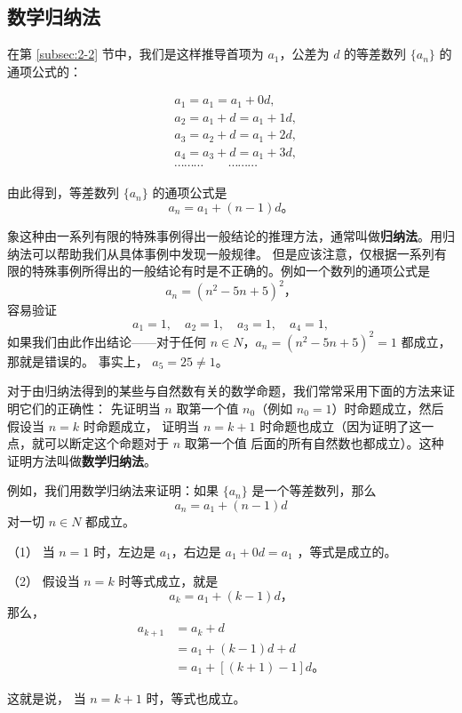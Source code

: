 \subsection{数学归纳法}\label{subsec:2-4}

在第 \ref{subsec:2-2} 节中，我们是这样推导首项为 $a_1$，公差为 $d$ 的等差数列 $\{a_n\}$ 的通项公式的：

\begin{align*}
    &a_1 = a_1 = a_1 + 0d, \\
    &a_2 = a_1 + d = a_1 + 1d, \\
    &a_3 = a_2 + d = a_1 + 2d, \\
    &a_4 = a_3 + d = a_1 + 3d, \\
    &\cdots\cdots\cdots \qquad \cdots\cdots\cdots
\end{align*}

由此得到，等差数列 $\{a_n\}$ 的通项公式是
$$ a_n = a_1 + (n - 1)d \text{。} $$

象这种由一系列有限的特殊事例得出一般结论的推理方法，通常叫做\textbf{归纳法}。用归纳法可以帮助我们从具体事例中发现一般规律。
但是应该注意，仅根据一系列有限的特殊事例所得出的一般结论有时是不正确的。例如一个数列的通项公式是
$$ a_n = (n^2 - 5n + 5)^2 \text{，} $$
容易验证
$$ a_1 = 1,\quad a_2 = 1,\quad a_3 = 1,\quad a_4 = 1, $$
如果我们由此作出结论——对于任何 $n \in N$，$a_n = (n^2 - 5n + 5)^2 = 1$ 都成立，那就是错误的。
事实上， $a_5 = 25 \neq 1$。

对于由归纳法得到的某些与自然数有关的数学命题，我们常常采用下面的方法来证明它们的正确性：
先证明当 $n$ 取第一个值 $n_0$（例如 $n_0 = 1$）时命题成立，然后假设当 $n = k$ 时命题成立，
证明当 $n = k + 1$ 时命题也成立（因为证明了这一点，就可以断定这个命题对于 $n$ 取第一个值
后面的所有自然数也都成立）。这种证明方法叫做\textbf{数学归纳法}。

例如，我们用数学归纳法来证明：如果 $\{a_n\}$ 是一个等差数列，那么
$$ a_n = a_1 + (n - 1)d $$
对一切 $n \in N$ 都成立。

\zhengming （1） 当 $n = 1$ 时，左边是 $a_1$，右边是 $a_1 + 0d = a_1$ ，等式是成立的。

（2） 假设当 $n = k$ 时等式成立，就是
$$ a_k = a_1 + (k - 1)d \text{，} $$
那么，
\begin{align*}
    a_{k+1} &= a_k + d \\
            &= a_1 + (k - 1)d + d \\
            &= a_1 + [(k + 1) - 1]d \text{。}
\end{align*}

这就是说， 当 $n = k + 1$ 时，等式也成立。

